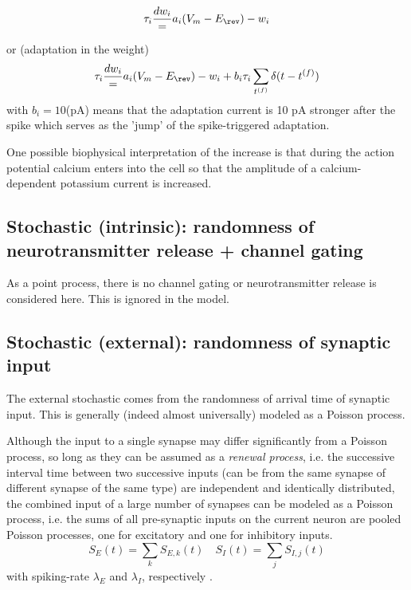 \begin{equation}
\tau_i \frac{dw_i} = a_i (V_m - E_\rev) - w_i 
\end{equation}

or (adaptation in the weight)
\begin{equation}
\tau_i \frac{dw_i} = a_i (V_m - E_\rev) - w_i + b_i \tau_i \sum_{t^{(f)}}
\delta(t-t^{(f)})
\end{equation}
with $b_i = 10$(pA) means that the adaptation current is 10 pA stronger after
the spike which serves as the 'jump' of the spike-triggered adaptation.

One possible biophysical interpretation of the increase is that during the
action potential calcium enters into the cell so that the amplitude of a
calcium-dependent potassium current is increased.


\subsection{Stochastic (intrinsic): randomness of neurotransmitter release +
channel gating}

As a point process, there is no channel gating or neurotransmitter release is
considered here. This is ignored in the model.

\subsection{Stochastic (external): randomness of synaptic input}

The external stochastic comes from the randomness of arrival time of synaptic
input. This is generally (indeed almost universally) modeled as a Poisson
process.

Although the input to a single synapse may differ significantly from a Poisson
process, so long as they can be assumed as a {\it renewal process}, i.e. the
successive interval time between two successive inputs (can be from the same
synapse of different synapse of the same type) are independent and identically
distributed, the combined input of a large number of synapses can be modeled as
a Poisson process, i.e. 
the sums of all pre-synaptic inputs on the current neuron are pooled Poisson
processes, one for excitatory and one for inhibitory inputs.
\begin{equation}
S_E(t) = \sum_k S_{E,k}(t) \quad S_I(t) = \sum_j S_{I,j}(t)
\end{equation}
with spiking-rate $\lambda_E$ and $\lambda_I$, respectively
\citep{burkitt2006a}.

